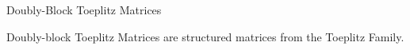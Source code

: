 \begin{frame}{Doubly-Block Toeplitz Matrices}

  \begin{minipage}{\textwidth}
    \centering
    Doubly-block Toeplitz Matrices are structured matrices from the Toeplitz Family.
  \end{minipage}
  \vspace{0.1cm}

  \begin{minipage}{\textwidth}
    \centering
\end{minipage}
\end{frame}
